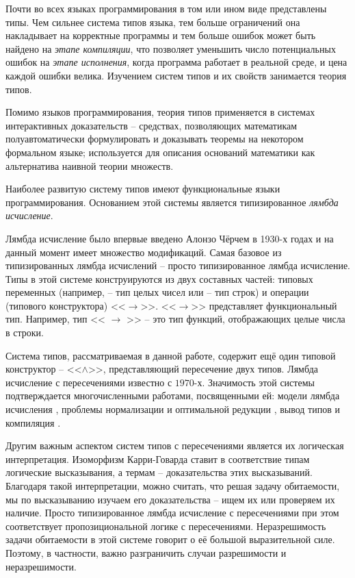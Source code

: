 \documentclass[../main.tex]{subfiles}
\begin{document}
Почти во всех языках программирования в том или ином виде представлены типы. Чем сильнее система типов языка, тем больше ограничений она накладывает на корректные программы и тем больше ошибок может быть найдено на {\it этапе компиляции}, что позволяет уменьшить число потенциальных ошибок на {\it этапе исполнения}, когда программа работает в реальной среде, и цена каждой ошибки велика. Изучением систем типов и их свойств занимается теория типов. 

Помимо языков программирования, теория типов применяется в системах интерактивных доказательств -- средствах, позволяющих математикам полуавтоматически формулировать и доказывать теоремы на некотором формальном языке; используется для описания оснований математики как альтернатива наивной теории множеств.

Наиболее развитую систему типов имеют функциональные языки программирования. Основанием этой системы является типизированное {\it лямбда исчисление}.


Лямбда исчисление было впервые введено Алонзо Чёрчем в 1930-х годах и на данный момент имеет множество модификаций. Самая базовое из типизированных лямбда исчислений -- просто типизированное лямбда исчисление. Типы в этой системе конструируются из двух составных частей: типовых переменных (например,  -- тип целых чисел или  -- тип строк) и операции (типового конструктора) <<$\to$>>. <<$\to$>> представляет функциональный тип. Например, тип << $\to$ >> -- это тип функций, отображающих целые числа в строки. 

Система типов, рассматриваемая в данной работе, содержит ещё один типовой конструктор -- <<$\wedge$>>, представляющий пересечение двух типов. Лямбда исчисление с пересечениями известно с $1970$-х. Значимость этой системы подтверждается многочисленными работами, посвященными ей: модели лямбда исчисления \cite{alessi_2006, coppo_1980}, проблемы нормализации и оптимальной редукции \cite{neergaard_2004, pottinger_1980}, вывод типов и компиляция \cite{kfoury_2004, wells_2002}.

Другим важным аспектом систем типов с пересечениями является их логическая интерпретация. Изоморфизм Карри-Говарда ставит в соответствие типам логические высказывания, а термам -- доказательства этих высказываний. 
Благодаря такой интерпретации, можно считать, что решая задачу обитаемости, мы по высказыванию изучаем его доказательства -- ищем их или проверяем их наличие.
Просто типизированное лямбда исчисление с пересечениями при этом соответствует пропозициональной логике с пересечениями. Неразрешимость задачи обитаемости в этой системе \cite{urzyczyn_1999} говорит о её большой выразительной силе. Поэтому, в частности, важно разграничить случаи разрешимости и неразрешимости. 
\end{document}
